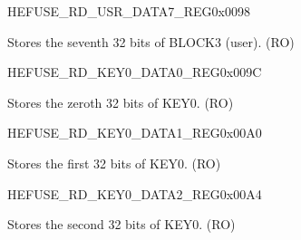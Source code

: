 \begin{register}{H}{EFUSE\_RD\_USR\_DATA7\_REG}{0x0098}\label{regdesc:EFUSERDUSRDATA7REG}
%
\regnewline%
\begin{regdesc}\begin{reglist}
\label{fielddesc:EFUSEUSRDATA7}\item [EFUSE\_USR\_DATA7] Stores the seventh 32 bits of BLOCK3 (user). (RO)
\end{reglist}\end{regdesc}
\end{register}


\begin{register}{H}{EFUSE\_RD\_KEY0\_DATA0\_REG}{0x009C}\label{regdesc:EFUSERDKEY0DATA0REG}
%
\regnewline%
\begin{regdesc}\begin{reglist}
\label{fielddesc:EFUSEKEY0DATA0}\item [EFUSE\_KEY0\_DATA0] Stores the zeroth 32 bits of KEY0. (RO)
\end{reglist}\end{regdesc}
\end{register}


\begin{register}{H}{EFUSE\_RD\_KEY0\_DATA1\_REG}{0x00A0}\label{regdesc:EFUSERDKEY0DATA1REG}
%
\regnewline%
\begin{regdesc}\begin{reglist}
\label{fielddesc:EFUSEKEY0DATA1}\item [EFUSE\_KEY0\_DATA1] Stores the first 32 bits of KEY0. (RO)
\end{reglist}\end{regdesc}
\end{register}


\begin{register}{H}{EFUSE\_RD\_KEY0\_DATA2\_REG}{0x00A4}\label{regdesc:EFUSERDKEY0DATA2REG}
%
\regnewline%
\begin{regdesc}\begin{reglist}
\label{fielddesc:EFUSEKEY0DATA2}\item [EFUSE\_KEY0\_DATA2] Stores the second 32 bits of KEY0. (RO)
\end{reglist}\end{regdesc}
\end{register}


